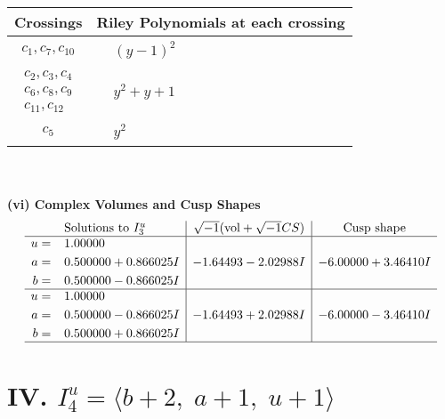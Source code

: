 \documentclass[1p]{elsarticle_modified}
\theoremstyle{definition}
\newcommand{\I}{\sqrt{-1}}
\begin{document}
\begin{tabular}{m{50pt}|m{274pt}}
Crossings & \hspace{64pt}Riley Polynomials at each crossing \\
\hline $$\begin{aligned}c_{1},c_{7},c_{10}\end{aligned}$$&$\begin{aligned}
&(y-1)^2
\end{aligned}$\\
\hline $$\begin{aligned}c_{2},c_{3},c_{4}\\c_{6},c_{8},c_{9}\\c_{11},c_{12}\end{aligned}$$&$\begin{aligned}
&y^2+y+1
\end{aligned}$\\
\hline $$\begin{aligned}c_{5}\end{aligned}$$&$\begin{aligned}
&y^2
\end{aligned}$\\
\hline
\end{tabular}\\~\\
\newpage\flushleft \textbf{(vi) Complex Volumes and Cusp Shapes}
$$\begin{array}{c|c|c}  
\text{Solutions to }I^u_{3}& \I (\text{vol} + \sqrt{-1}CS) & \text{Cusp shape}\\
 \hline 
\begin{aligned}
u &= \phantom{-}1.00000\phantom{ +0.000000I} \\
a &= \phantom{-}0.500000 + 0.866025 I \\
b &= \phantom{-}0.500000 - 0.866025 I\end{aligned}
 & -1.64493 - 2.02988 I & -6.00000 + 3.46410 I \\ \hline\begin{aligned}
u &= \phantom{-}1.00000\phantom{ +0.000000I} \\
a &= \phantom{-}0.500000 - 0.866025 I \\
b &= \phantom{-}0.500000 + 0.866025 I\end{aligned}
 & -1.64493 + 2.02988 I & -6.00000 - 3.46410 I\\
 \hline 
 \end{array}$$\newpage\newpage\renewcommand{\arraystretch}{1}
\centering \section*{IV. $I^u_{4}= \langle b+2,\;a+1,\;u+1 \rangle$}
\end{document}

